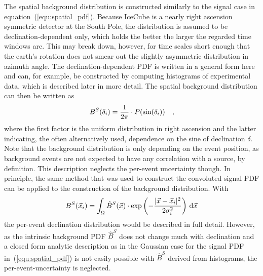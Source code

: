 The spatial background distribution is constructed similarly to the signal case in equation~(\ref{equ:spatial_pdf}).
Because IceCube is a nearly right ascension symmetric detector at the South Pole, the distribution is assumed to be declination-dependent only, which holds the better the larger the regarded time windows are.
This may break down, however, for time scales short enough that the earth's rotation does not smear out the slightly asymmetric distribution in azimuth angle.
The declination-dependent PDF is written in a general form here and can, for example, be constructed by computing histograms of experimental data, which is described later in more detail.
The spatial background distribution can then be written as
\begin{equation}
  B^S(\delta_i) = \frac{1}{2\pi} \cdot P(\sin(\delta_i))
  \quad\text{,}
\end{equation}
where the first factor is the uniform distribution in right ascension and the latter indicating, the often alternatively used, dependence on the sine of declination $\delta$.
Note that the background distribution is only depending on the event position, as background  events are not expected to have any correlation with a source, by definition.
This description neglects the per-event uncertainty though.
In principle, the same method that was used to construct the convoluted signal PDF can be applied to the construction of the background distribution.
With
\begin{equation}
  B^S(\vec{x}_i) =
    \int_\Omega \hat{B}^S(\vec{x}) \cdot
      \exp\left(-\frac{|\vec{x}-\vec{x}_i|^2}{2\sigma_i^2}\right)
      \,\mathrm{d}\vec{x}
\end{equation}
the per-event declination distribution would be described in full detail.
However, as the intrinsic background PDF $\hat{B}^S$ does not change much with declination and a closed form analytic description as in the Gaussian case for the signal PDF in~(\ref{equ:spatial_pdf}) is not easily possible with $\hat{B}^S$ derived from histograms, the per-event-uncertainty is neglected.


